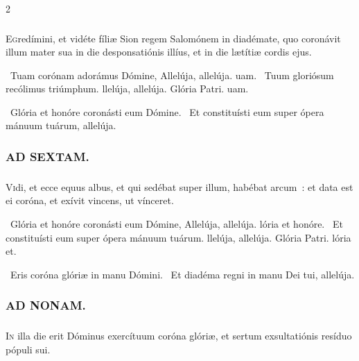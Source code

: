 \documentclass[9pt,twoside]{extarticle}
\begin{document}
\begin{multicols}{2}
{{\subsubsection*{}
\lettrine{E}gredímini, et vidéte fíliæ Sion regem Salomónem in diadémate, quo coronávit illum mater sua in die desponsatiónis illíus, et in die lætítiæ cordis ejus.

\begin{tightlist}{}
\item {}~Tuam corónam adorámus Dómine, \textred{*} Allelúja, allelúja. uam. ~Tuum gloriósum recólimus triúmphum. llelúja, allelúja. Glória Patri. uam.
\item {}~Glória et honóre coronásti eum Dómine. ~Et constituísti eum super ópera mánuum tuárum, allelúja.
\end{tightlist}

\subsubsection*{\center \textsc{AD SEXTAM.}}
\subsubsection*{}
\lettrine{V}idi, et ecce equus albus, et qui sedébat super illum, habébat arcum~: et data est ei coróna, et exívit vincens, ut vínceret.

\begin{tightlist}{}
\item {}~Glória et honóre coronásti eum Dómine, \textred{*} Allelúja, allelúja. lória et honóre. ~Et constituísti eum super ópera mánuum tuárum. llelúja, allelúja. Glória Patri. lória et.
\item {}~Eris coróna glóriæ in manu Dómini. ~Et diadéma regni in manu Dei tui, allelúja.
\end{tightlist}

\subsubsection*{\center \textsc{AD NONAM.}}
\subsubsection*{}
\lettrine{I}n illa die erit Dóminus exercítuum coróna glóriæ, et sertum exsultatiónis resíduo pópuli sui.

}}
\end{multicols}
\end{document}
